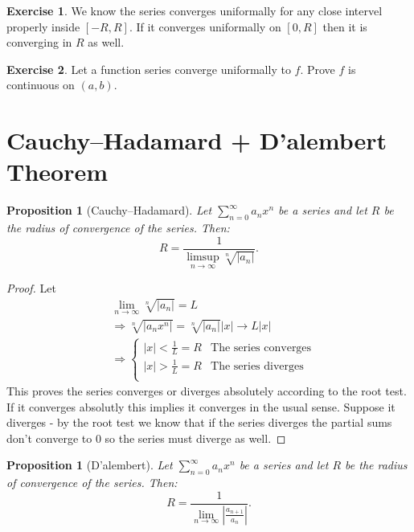 \documentclass[11pt,a4paper]{article}
\theoremstyle{definition}
\newtheorem{exercise}{Exercise}[section]
\theoremstyle{plain}
\newtheorem{proposition}[theorem]{Proposition}
\begin{document}
  \begin{exercise}
    We know the series converges uniformally for any close intervel 
    properly inside $[-R,R]$.
    If it converges uniformally on $[0,R]$ then it is converging in $R$ as well.
  \end{exercise}
  \begin{exercise}
    Let a function series converge uniformally to $f$. 
    Prove $f$ is continuous on $(a,b)$.
  \end{exercise}
	
	\newpage
	
	\section{Cauchy--Hadamard + D'alembert Theorem}
  \begin{proposition}[Cauchy--Hadamard]
    Let $\sum_{n=0}^{\infty} a_n x^n$ be a series and 
    let $R$ be the radius of convergence of the series.
    Then:
    \[
      R = \frac{1}{\limsup_{n\to\infty}{\sqrt[n]{|a_n|}}}.
    \]
  \end{proposition}

  \begin{proof}
    Let
    \begin{align*}
      &\lim_{n\to\infty}{\sqrt[n]{|a_n|}} = L
      \\ &\Rightarrow
      \sqrt[n]{|a_nx^n|}=\sqrt[n]{|a_n|}|x|\to L|x|
      \\ &\Rightarrow
      \begin{cases}
      |x| < \frac{1}{L} = R & \text{The series converges} \\
      |x| > \frac{1}{L} = R & \text{The series diverges} \\
      \end{cases}
    \end{align*}
    This proves the series converges or diverges absolutely according to 
    the root test. 
    If it converges absolutly this implies it converges in the usual sense. 
    Suppose it diverges - by the root test we know that 
    if the series diverges the partial sums don't converge to $0$ 
    so the series must diverge as well.
  \end{proof}

  \begin{proposition}[D'alembert]
    Let $\sum_{n=0}^{\infty} a_n x^n$ be a series and 
    let $R$ be the radius of convergence of the series.
    Then:
    \[
      R = \frac{1}{\lim_{n\to\infty}{\left|\frac{a_{n+1}}
        {a_n}\right|}}.
    \]
  \end{proposition}
\end{document}
